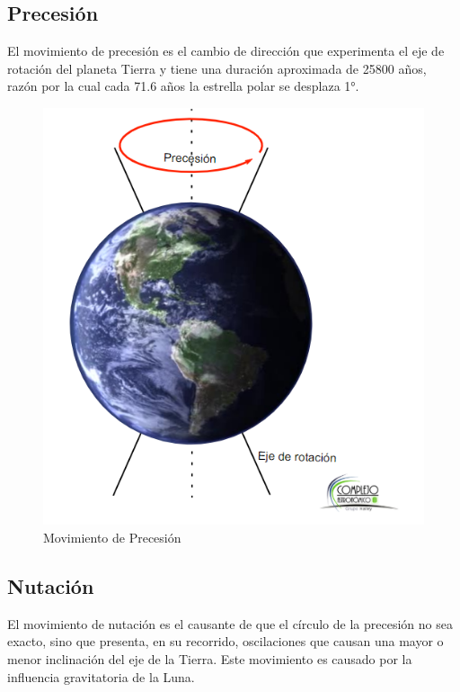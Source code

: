\documentclass[10pt,a4paper]{article}
\begin{document}
\subsection{Precesión}
El movimiento de precesión es el cambio de dirección que experimenta el eje de rotación del planeta Tierra y tiene una duración aproximada de 25800 años, razón por la cual cada 71.6 años la estrella polar se desplaza 1°. 

\begin{figure}[H]
\centering
\includegraphics[scale=0.45]{Imagenes/Precesion_01} 
\caption{Movimiento de Precesión}
\label{m_traslacion}
\end{figure}

\subsection{Nutación}
El movimiento de nutación es el causante de que el círculo de la precesión no sea exacto, sino que presenta, en su recorrido, oscilaciones que causan una mayor o menor inclinación del eje de la Tierra. Este movimiento es causado por la influencia gravitatoria de la Luna.
\end{document}
